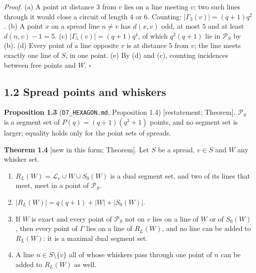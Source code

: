 \documentclass[
  10pt,
]{article}
\begin{document}
\emph{Proof.} (a) A point at distance \(3\) from \(v\) lies on a line
meeting \(v\); two such lines through it would close a circuit of length
\(4\) or \(6\). Counting: \(|\Gamma_3(v)|=(q+1)q^2\). (b) A point \(x\)
on a spread line \(n\ne v\) has \(d(x,v)\) odd, at most \(5\) and at
least \(d(n,v)-1=5\). (c) \(|\Gamma_5(v)|=(q+1)q^4\), of which
\(q^3(q+1)\) lie in \(\mathcal P_S\) by (b). (d) Every point of a line
opposite \(v\) is at distance \(5\) from \(v\); the line meets exactly
one line of \(S\), in one point. (e) By (d) and (c), counting incidences
between free points and \(W\). \(\square\)

\hypertarget{spread-points-and-whiskers}{%
\subsection{1.2 Spread points and
whiskers}\label{spread-points-and-whiskers}}

\textbf{Proposition 1.3} (\texttt{D7\_HEXAGON.md}, Proposition 1.4)
{[}restatement; Theorem{]}. \(\mathcal P_S\) is a segment set of
\(P(q)=(q+1)(q^3+1)\) points, and no segment set is larger; equality
holds only for the point sets of spreads.

\textbf{Theorem 1.4} {[}new in this form; Theorem{]}. Let \(S\) be a
spread, \(v\in S\) and \(W\) any whisker set.

\begin{enumerate}
\def\labelenumi{(\alph{enumi})}
\item
  \(R_L(W)=\mathcal L_v\cup W\cup S_0(W)\) is a dual segment set, and
  two of its lines that meet, meet in a point of \(\mathcal P_S\).
\item
  \(|R_L(W)|=q(q+1)+|W|+|S_0(W)|\).
\item
  If \(W\) is exact and every point of \(\mathcal P_S\) not on \(v\)
  lies on a line of \(W\) or of \(S_0(W)\), then every point of
  \(\Gamma\) lies on a line of \(R_L(W)\), and no line can be added to
  \(R_L(W)\): it is a maximal dual segment set.
\item
  A line \(n\in S\setminus\{v\}\) all of whose whiskers pass through one
  point of \(n\) can be added to \(R_L(W)\) as well.
\end{enumerate}
\end{document}
